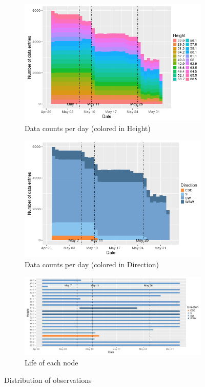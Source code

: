 \documentclass[11pt]{article}
\begin{document}
\begin{figure}[here]
\centering
\begin{subfigure}{.5\textwidth}
  \centering
  \includegraphics[width=1\linewidth]{../figures/distHeight.png}
  \caption{Data counts per day (colored in Height)}
  \label{fig:distHeight}
\end{subfigure}%
\begin{subfigure}{.5\textwidth}
  \centering
  \includegraphics[width=1\linewidth]{../figures/distDirec.png}
  \caption{Data counts per day (colored in Direction)}
  \label{fig:distDirec}
\end{subfigure}
\null \vspace{2em}
\begin{subfigure}{1\textwidth}
  \centering
  \includegraphics[width=1\linewidth]{../figures/lifeHeight.png}
  \caption{Life of each node}
  \label{fig:lifeHeight}
\end{subfigure}
\caption{Distribution of observations}
\end{figure}
\pagebreak
\end{document}
